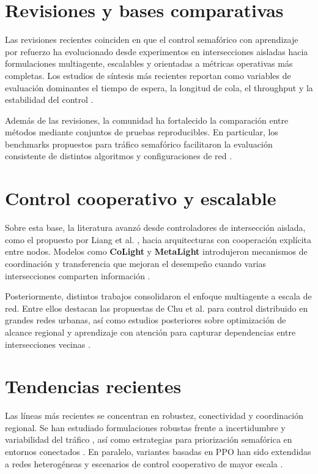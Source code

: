 \section{Revisiones y bases comparativas}
Las revisiones recientes coinciden en que el control semafórico con aprendizaje por refuerzo ha evolucionado desde experimentos en intersecciones aisladas hacia formulaciones multiagente, escalables y orientadas a métricas operativas más completas. Los estudios de síntesis más recientes reportan como variables de evaluación dominantes el tiempo de espera, la longitud de cola, el throughput y la estabilidad del control \cite{survey_prajapati2024,survey_zhao2024,review_rasheed2020,review_noaeen2022}.

Además de las revisiones, la comunidad ha fortalecido la comparación entre métodos mediante conjuntos de pruebas reproducibles. En particular, los benchmarks propuestos para tráfico semafórico facilitaron la evaluación consistente de distintos algoritmos y configuraciones de red \cite{benchmark_ault2021}.

\section{Control cooperativo y escalable}
Sobre esta base, la literatura avanzó desde controladores de intersección aislada, como el propuesto por Liang et al. \cite{liang2019}, hacia arquitecturas con cooperación explícita entre nodos. Modelos como \textbf{CoLight} y \textbf{MetaLight} introdujeron mecanismos de coordinación y transferencia que mejoran el desempeño cuando varias intersecciones comparten información \cite{colight2019,metalight2020}.

Posteriormente, distintos trabajos consolidaron el enfoque multiagente a escala de red. Entre ellos destacan las propuestas de Chu et al. para control distribuido en grandes redes urbanas, así como estudios posteriores sobre optimización de alcance regional y aprendizaje con atención para capturar dependencias entre intersecciones vecinas \cite{marl_chu2020,networkwide_li2021,attendlight2020}.

\section{Tendencias recientes}
Las líneas más recientes se concentran en robustez, conectividad y coordinación regional. Se han estudiado formulaciones robustas frente a incertidumbre y variabilidad del tráfico \cite{robust_tan2020}, así como estrategias para priorización semafórica en entornos conectados \cite{connected_long2022}. En paralelo, variantes basadas en PPO han sido extendidas a redes heterogéneas y escenarios de control cooperativo de mayor escala \cite{haps_ppo2025}.

